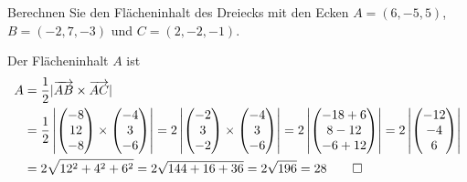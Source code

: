 Berechnen Sie den Flächeninhalt des Dreiecks mit den Ecken $A=(6,-5,5)$,
$B=(-2,7,-3)$ und $C=(2,-2,-1)$.

\begin{loesung}
Der Flächeninhalt $A$ ist
\begin{align*}
A&=\frac12|\overrightarrow{AB}\times\overrightarrow{AC}|\\
&=
\frac12\left|
\begin{pmatrix}-8\\12\\-8\end{pmatrix}
\times
\begin{pmatrix}-4\\3\\-6\end{pmatrix}
\right|
=
2\left|
\begin{pmatrix}-2\\3\\-2\end{pmatrix}
\times
\begin{pmatrix}-4\\3\\-6\end{pmatrix}
\right|
=
2\left|
\begin{pmatrix}
-18+6\\8-12\\-6+12
\end{pmatrix}
\right|
=
2\left|
\begin{pmatrix}
-12\\-4\\6
\end{pmatrix}
\right|
\\
&=
2\sqrt{12^2+4^2+6^2}
=
2\sqrt{144+16+36}=2\sqrt{196}=28
\qedhere
\end{align*}
\end{loesung}

